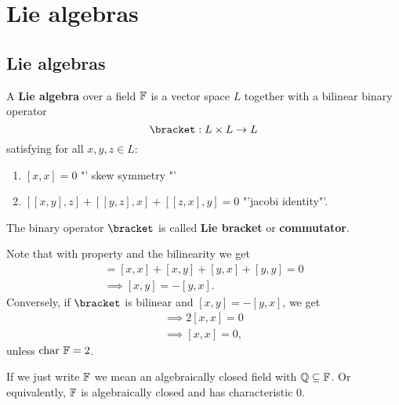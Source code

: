 
\chapter{Lie algebras}
\section{Lie algebras}
\begin{definition}
    A \textbf{Lie algebra} over a field $\mathbb{F}$ 
    is a vector space $L$ together with a bilinear binary operator 
    $$ \bracket : L \times L \to L $$ satisfying for all $x,y,z \in L$:
    \begin{enumerate}[label=(\arabic*)]
        \item $[x,x] = 0$ "' skew symmetry "'\label{item:skew}
        \item $[[x,y],z] + [[y,z],x] + [[z,x],y] = 0$ "'jacobi identity"'.
    \end{enumerate}

    The binary operator $\bracket$ is called \textbf{Lie bracket} or \textbf{commutator}.
\end{definition}

\begin{remark}
    Note that with property  and the bilinearity we get
    \begin{align*}
        [(x+y),(x+y)] = [x,x] + [x,y] + [y,x] + [y,y] = 0 \\
        \implies [x,y] = -[y,x].
    \end{align*}
    Conversely, if $\bracket$ is bilinear and $[x,y] = -[y,x]$, we get
    \begin{align*}
        \implies 2 [x,x] = 0\\
        \implies [x,x] = 0,
    \end{align*}
    unless $\textrm{char } \mathbb{F} = 2$.
\end{remark}

\begin{notation}
    If we just write $\mathbb{F}$ we mean an algebraically closed field with $\mathbb{Q} \subseteq \mathbb{F}$.
    Or equivalently, $\mathbb{F}$ is algebraically closed and has characteristic $0$.
\end{notation}

